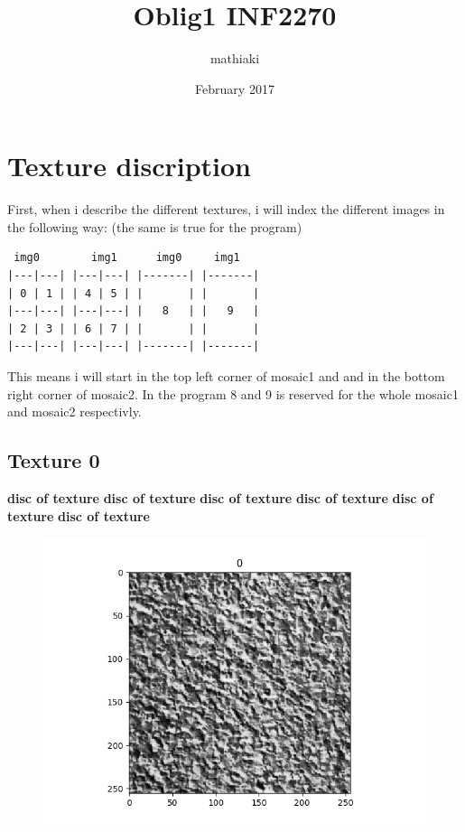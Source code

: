 \documentclass{article}
\title{Oblig1 INF2270}
\author{mathiaki}
\date{February 2017}
\begin{document}
\maketitle

\newpage
\tableofcontents
\newpage

\section{Texture discription}
First, when i describe the different textures, i will index the different images in the following way: (the same is true for the program)\\
\begin{verbatim}
 img0        img1      img0     img1
|---|---| |---|---| |-------| |-------|
| 0 | 1 | | 4 | 5 | |       | |       |
|---|---| |---|---| |   8   | |   9   |
| 2 | 3 | | 6 | 7 | |       | |       |
|---|---| |---|---| |-------| |-------|

\end{verbatim}

This means i will start in the top left corner of mosaic1 and and in the bottom right corner of mosaic2. In the program 8 and 9 is reserved for the whole mosaic1 and mosaic2 respectivly. 

\subsection{Texture 0}
\textbf{disc of texture}
\textbf{disc of texture}
\textbf{disc of texture}
\textbf{disc of texture}
\textbf{disc of texture}
\textbf{disc of texture}
\begin{figure}[h!]
\includegraphics[scale=0.5]{0.png}
\end{figure}
\end{document}
